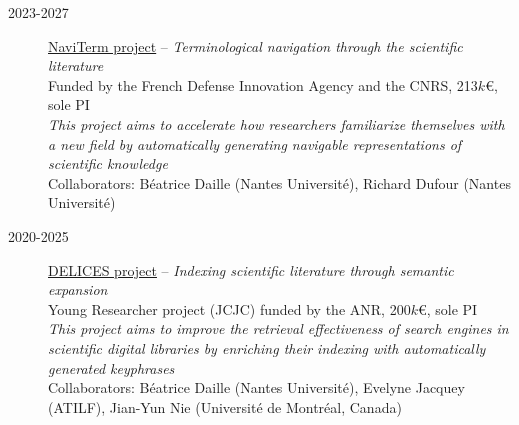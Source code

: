 \begin{description}

    \item[2023-2027] \href{https://cnrs-naviterm.github.io/}{NaviTerm project} --
                    \emph{Terminological navigation through the scientific literature} \\
                    Funded by the French Defense Innovation Agency and the CNRS, 213$k$€, sole PI \\[.1em]
                    \emph{This project aims to accelerate how researchers familiarize themselves with a new field by automatically generating navigable representations of scientific knowledge}\\[.1em]
                    Collaborators: Béatrice Daille (Nantes Université), Richard Dufour (Nantes Université)

    \item[2020-2025] \href{https://anr-delices.github.io/}{DELICES project} --
                    \emph{Indexing scientific literature through semantic expansion} \\
                    Young Researcher project (JCJC) funded by the ANR, 200$k$€, sole PI \\[.1em]
                    \emph{This project aims to improve the retrieval effectiveness of search engines in scientific digital libraries by enriching their indexing with automatically generated keyphrases}\\[.1em]
                    Collaborators: Béatrice Daille (Nantes Université), Evelyne Jacquey (ATILF), Jian-Yun Nie (Université de Montréal, Canada)


\end{description}
